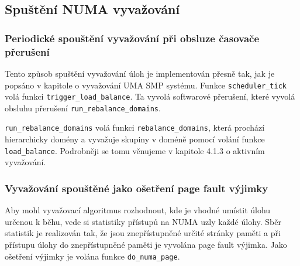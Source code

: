 \documentclass[
  master=true,
  font=sans,
  printversion=false,
  joinlists=true,
  figures=true,
  tables=true,
  sourcecodes=false,
  theorems=false,
  bibencoding=utf8,
  language=czech,
  encoding=utf8,
  field=ainfk,
  biblatex,
  glossaries,
  index
]{kidiplom}
\begin{document}
\subsection{Spuštění NUMA vyvažování}

\subsubsection{Periodické spouštění vyvažování při obsluze časovače přerušení}
Tento způsob spuštění vyvažování úloh je implementován přesně tak, jak je popsáno v kapitole o vyvažování UMA SMP systému. Funkce \verb#scheduler_tick# volá funkci \verb#trigger_load_balance#. Ta vyvolá softwarové přerušení, které vyvolá obsluhu přerušení \verb#run_rebalance_domains#. 

\noindent
\verb#run_rebalance_domains# volá funkci \verb#rebalance_domains#, která prochází hierarchicky domény a vyvažuje skupiny v doméně pomocí volání funkce \verb#load_balance#. Podrobněji se tomu věnujeme v kapitole 4.1.3 o aktivním vyvažování.

\subsubsection{Vyvažování spouštěné jako ošetření page fault výjimky}
\label{page fault}
Aby mohl vyvažovací algoritmus rozhodnout, kde je vhodné umístit úlohu určenou k běhu, vede si statistiky přístupů na NUMA uzly každé úlohy. Sběr statistik je realizován tak, že jsou znepřístupněné určité stránky paměti a při přístupu úlohy do znepřístupněné paměti je vyvolána page fault výjimka. Jako ošetření výjimky je volána funkce \verb#do_numa_page#. 
\end{document}

